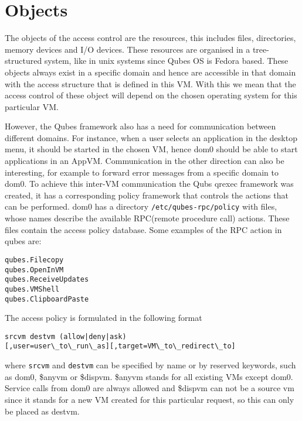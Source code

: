 \documentclass[runningheads,a4paper]{article}
\begin{document}
\section{Objects}

The objects of the access control are the resources, this includes
files, directories, memory devices and I/O devices. These resources
are organised in a tree-structured system, like in unix systems since Qubes OS is Fedora based.
These
objects always exist in a specific domain and hence are accessible in
that domain with the access structure that is defined in this VM. With
this we mean that the access control of these object will depend on
the chosen operating system for this particular VM. 

However, the Qubes framework also has a need for communication between
different domains. For instance, when a user selects an application in
the desktop menu, it should be started in the chosen VM, hence dom0
should be able to start applications in an AppVM. Communication in the
other direction can also be interesting, for example to forward error
messages from a specific domain to dom0. To achieve this inter-VM
communication the Qubs qrexec framework was created, it has a
corresponding policy framework that controls the actions that can be
performed. dom0 has a directory \texttt{/etc/qubes-rpc/policy} with
files, whose names describe the available RPC(remote procedure call)
actions. These files contain the access policy database. Some examples
of the RPC action in qubes are:
\begin{verbatim}
qubes.Filecopy
qubes.OpenInVM
qubes.ReceiveUpdates
qubes.VMShell
qubes.ClipboardPaste
\end{verbatim} 
The access policy is formulated in the following format
\begin{verbatim}
srcvm destvm (allow|deny|ask)
[,user=user\_to\_run\_as][,target=VM\_to\_redirect\_to]
\end{verbatim}
where \texttt{srcvm} and \texttt{destvm} can be specified by name or
by reserved keywords, such as dom0, \$anyvm or \$dispvm. \$anyvm
stands for all existing VMs except dom0. Service calls
from dom0 are always allowed and \$dispvm can not be a source vm since
it stands for a new VM created for this particular request, so this
can only be placed as destvm.
\end{document}
